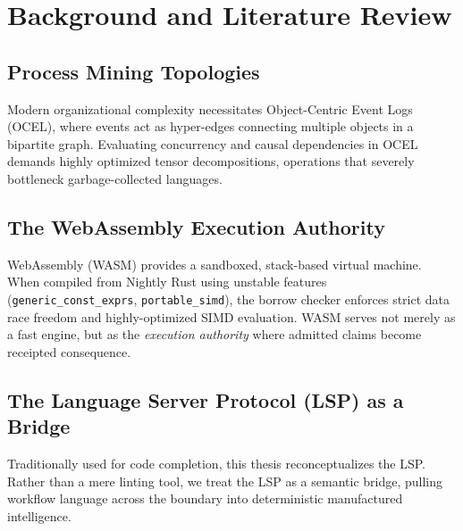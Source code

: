 
\chapter{Background and Literature Review}
\section{Process Mining Topologies}
Modern organizational complexity necessitates Object-Centric Event Logs (OCEL), where events act as hyper-edges connecting multiple objects in a bipartite graph. Evaluating concurrency and causal dependencies in OCEL demands highly optimized tensor decompositions, operations that severely bottleneck garbage-collected languages.

\section{The WebAssembly Execution Authority}
WebAssembly (WASM) provides a sandboxed, stack-based virtual machine. When compiled from Nightly Rust using unstable features (\texttt{generic\_const\_exprs}, \texttt{portable\_simd}), the borrow checker enforces strict data race freedom and highly-optimized SIMD evaluation. WASM serves not merely as a fast engine, but as the \textit{execution authority} where admitted claims become receipted consequence.

\section{The Language Server Protocol (LSP) as a Bridge}
Traditionally used for code completion, this thesis reconceptualizes the LSP. Rather than a mere linting tool, we treat the LSP as a semantic bridge, pulling workflow language across the boundary into deterministic manufactured intelligence.
